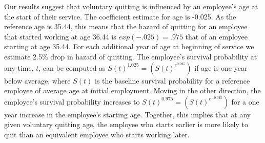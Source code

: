 \documentclass[12pt,letterpaper]{article}
\begin{document}
Our results suggest that voluntary quitting is influenced by an employee's age at the start of their service. The coefficient estimate for age is -0.025. As the reference age is 35.44, this means that the hazard of quitting for an employee that started working at age 36.44 is $exp(-.025)=.975$ that of an employee starting at age 35.44. For each additional year of age at beginning of service we estimate 2.5\% drop in hazard of quitting. The employee's survival probability at any time, $t$, can be computed as $S(t)^{1.025} = (S(t)^{e^{0.025}})$ if age is one year below average, where $S(t)$ is the baseline survival probability for a reference employee of average age at initial employment. Moving in the other direction, the employee's survival probability increases to $S(t)^{0.975}=(S(t)^{e^{-0.025}})$ for a one year increase in the employee's starting age. Together, this implies that at any given voluntary quitting age, the employee who starts earlier is more likely to quit than an equivalent employee who starts working later.
\end{document}
